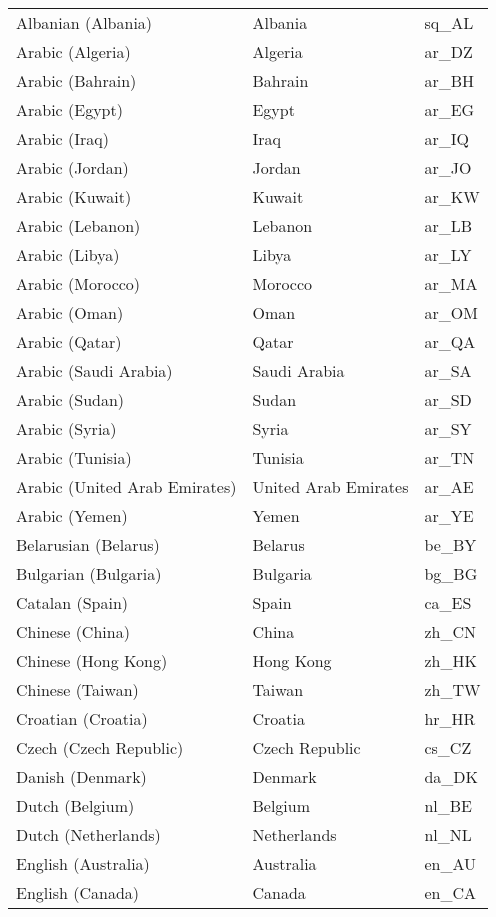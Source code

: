 %
		\begin{supertabular}{|p{4.5cm}p{4.5cm}p{2.2cm}|}
		\hline
Albanian (Albania)&Albania&sq\_AL\\
Arabic (Algeria)&Algeria&ar\_DZ\\
Arabic (Bahrain)&Bahrain&ar\_BH\\
Arabic (Egypt)&Egypt&ar\_EG\\
Arabic (Iraq)&Iraq&ar\_IQ\\
Arabic (Jordan)&Jordan&ar\_JO\\
Arabic (Kuwait)&Kuwait&ar\_KW\\
Arabic (Lebanon)&Lebanon&ar\_LB\\
Arabic (Libya)&Libya&ar\_LY\\
Arabic (Morocco)&Morocco&ar\_MA\\
Arabic (Oman)&Oman&ar\_OM\\
Arabic (Qatar)&Qatar&ar\_QA\\
Arabic (Saudi Arabia)&Saudi Arabia&ar\_SA\\
Arabic (Sudan)&Sudan&ar\_SD\\
Arabic (Syria)&Syria&ar\_SY\\
Arabic (Tunisia)&Tunisia&ar\_TN\\
Arabic (United Arab Emirates)&United Arab Emirates&ar\_AE\\
Arabic (Yemen)&Yemen&ar\_YE\\
Belarusian (Belarus)&Belarus&be\_BY\\
Bulgarian (Bulgaria)&Bulgaria&bg\_BG\\
Catalan (Spain)&Spain&ca\_ES\\
Chinese (China)&China&zh\_CN\\
Chinese (Hong Kong)&Hong Kong&zh\_HK\\
Chinese (Taiwan)&Taiwan&zh\_TW\\
Croatian (Croatia)&Croatia&hr\_HR\\
Czech (Czech Republic)&Czech Republic&cs\_CZ\\
Danish (Denmark)&Denmark&da\_DK\\
Dutch (Belgium)&Belgium&nl\_BE\\
Dutch (Netherlands)&Netherlands&nl\_NL\\
English (Australia)&Australia&en\_AU\\
English (Canada)&Canada&en\_CA\\

\end{supertabular}
